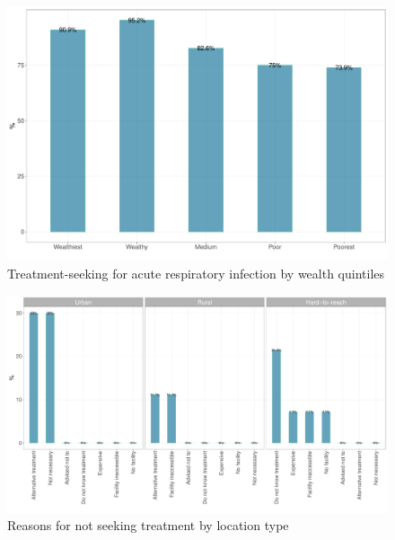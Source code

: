 \documentclass[12pt,a4paper]{article}
\begin{document}
\begin{figure}[H]

{\centering \includegraphics{kayinReport_files/figure-latex/ari2plot-1} 

}

\caption{Treatment-seeking for acute respiratory infection by wealth quintiles}\label{fig:ari2plot}
\end{figure}

\begin{figure}[H]

{\centering \includegraphics{kayinReport_files/figure-latex/ari3plot-1} 

}

\caption{Reasons for not seeking treatment by location type}\label{fig:ari3plot}
\end{figure}
\end{document}
